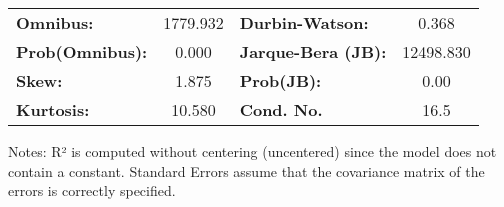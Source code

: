 \begin{center}
\begin{tabular}{lcccccc}
\bottomrule
\end{tabular}
\begin{tabular}{lclc}
\textbf{Omnibus:}       & 1779.932 & \textbf{  Durbin-Watson:     } &     0.368  \\
\textbf{Prob(Omnibus):} &   0.000  & \textbf{  Jarque-Bera (JB):  } & 12498.830  \\
\textbf{Skew:}          &   1.875  & \textbf{  Prob(JB):          } &      0.00  \\
\textbf{Kurtosis:}      &  10.580  & \textbf{  Cond. No.          } &      16.5  \\
\bottomrule
\end{tabular}
\end{center}

Notes: \newline
 [1] R² is computed without centering (uncentered) since the model does not contain a constant. \newline
 [2] Standard Errors assume that the covariance matrix of the errors is correctly specified.